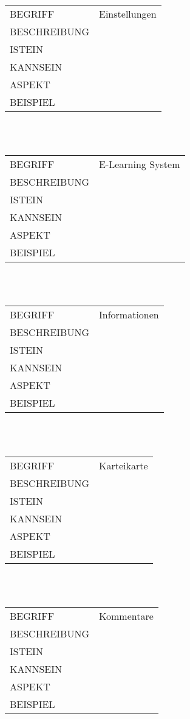 \documentclass[12pt,a4paper]{article}
\begin{document}
\begin{tabular}{l p{10cm}}
BEGRIFF 	 & Einstellungen \\ 
BESCHREIBUNG & \\ 
ISTEIN   	 & \\
KANNSEIN 	 & \\ 
ASPEKT   	 & \\
BEISPIEL 	 & \\
\hline
\end{tabular}\\\\  

\begin{tabular}{l p{10cm}}
BEGRIFF 	 & E-Learning System \\ 
BESCHREIBUNG & \\ 
ISTEIN   	 & \\
KANNSEIN 	 & \\ 
ASPEKT   	 & \\
BEISPIEL 	 & \\
\hline
\end{tabular}\\\\  

\begin{tabular}{l p{10cm}}
BEGRIFF 	 & Informationen \\ 
BESCHREIBUNG & \\ 
ISTEIN   	 & \\
KANNSEIN 	 & \\ 
ASPEKT   	 & \\
BEISPIEL 	 & \\
\hline
\end{tabular}\\\\  

\begin{tabular}{l p{10cm}}
BEGRIFF 	 & Karteikarte \\ 
BESCHREIBUNG & \\ 
ISTEIN   	 & \\
KANNSEIN 	 & \\ 
ASPEKT   	 & \\
BEISPIEL 	 & \\
\hline
\end{tabular}\\\\  

\vspace{1cm}

\begin{tabular}{l p{10cm}}
BEGRIFF 	 & Kommentare \\ 
BESCHREIBUNG & \\ 
ISTEIN   	 & \\
KANNSEIN 	 & \\ 
ASPEKT   	 & \\
BEISPIEL 	 & \\
\hline
\end{tabular}\\\\  
\end{document}
